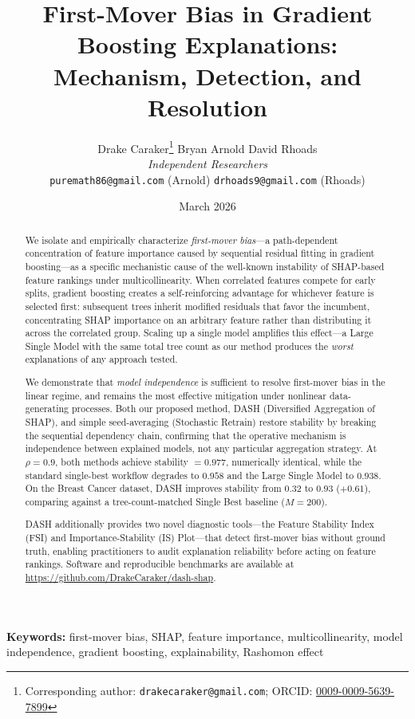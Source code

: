\documentclass[11pt]{article}
\title{%
  \textbf{First-Mover Bias in Gradient Boosting Explanations:} \\[6pt]
  \large Mechanism, Detection, and Resolution
}
\author{
  Drake Caraker\thanks{Corresponding author: \texttt{drakecaraker@gmail.com}; ORCID: \href{https://orcid.org/0009-0009-5639-7899}{0009-0009-5639-7899}} \quad
  Bryan Arnold \quad
  David Rhoads \\[4pt]
  \textit{Independent Researchers} \\[2pt]
  \small\texttt{puremath86@gmail.com} (Arnold) \quad
  \small\texttt{drhoads9@gmail.com} (Rhoads)
}
\date{March 2026}
\newcommand{\dash}{\textsc{DASH}}
\newcommand{\rhovar}{\rho}
\begin{document}
\maketitle

\begin{abstract}
We isolate and empirically characterize \emph{first-mover bias}---a
path-dependent concentration of feature importance caused by sequential
residual fitting in gradient boosting---as a specific mechanistic cause of the
well-known instability of SHAP-based feature rankings under
multicollinearity. When correlated features
compete for early splits, gradient boosting creates a self-reinforcing
advantage for whichever feature is selected first: subsequent trees inherit
modified residuals that favor the incumbent, concentrating SHAP importance on
an arbitrary feature rather than distributing it across the correlated group.
Scaling up a single model amplifies this effect---a Large Single Model with
the same total tree count as our method produces the \emph{worst} explanations
of any approach tested.

We demonstrate that \emph{model independence} is sufficient to resolve
first-mover bias in the linear regime, and remains the most effective
mitigation under nonlinear data-generating processes. Both our proposed
method, \dash{} (Diversified Aggregation of SHAP), and simple seed-averaging
(Stochastic Retrain) restore stability by breaking the sequential dependency
chain, confirming that the operative mechanism is independence between
explained models, not any particular aggregation strategy. At $\rhovar = 0.9$, both methods achieve stability
$= 0.977$, numerically identical, while the standard
single-best workflow degrades to $0.958$ and the Large Single Model to
$0.938$. On the Breast Cancer dataset, \dash{} improves stability from
$0.32$ to $0.93$ ($+0.61$), comparing against a tree-count-matched
Single Best baseline ($M{=}200$).

\dash{} additionally provides two novel diagnostic tools---the Feature
Stability Index (FSI) and Importance-Stability (IS) Plot---that detect
first-mover bias without ground truth, enabling practitioners to audit
explanation reliability before acting on feature rankings. Software and
reproducible benchmarks are available at
\url{https://github.com/DrakeCaraker/dash-shap}.
\end{abstract}

\smallskip
\noindent\textbf{Keywords:} first-mover bias, SHAP, feature importance,
multicollinearity, model independence, gradient boosting, explainability,
Rashomon effect
\end{document}
